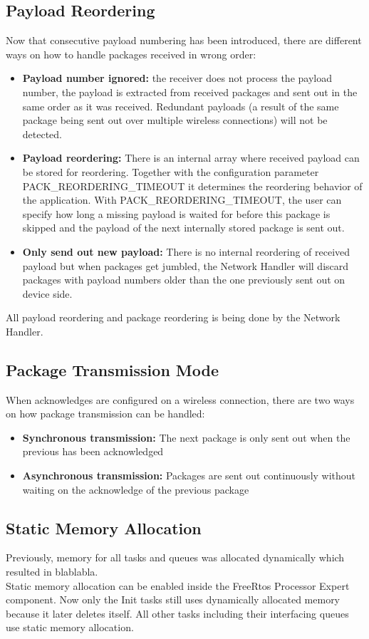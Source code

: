 \subsection{Payload Reordering}
Now that consecutive payload numbering has been introduced, there are different ways on how to handle packages received in wrong order:
\begin{itemize}
    \item \textbf{Payload number ignored:} the receiver does not process the payload number, the payload is extracted from received packages and sent out in the same order as it was received. Redundant payloads (a result of the same package being sent out over multiple wireless connections) will not be detected.
    \item \textbf{Payload reordering:} There is an internal array where received payload can be stored for reordering. Together with the configuration parameter PACK\_REORDERING\_TIMEOUT it determines the reordering behavior of the application. With PACK\_REORDERING\_TIMEOUT, the user can specify how long a missing payload is waited for before this package is skipped and the payload of the next internally stored package is sent out.
    \item \textbf{Only send out new payload:} There is no internal reordering of received payload but when packages get jumbled, the Network Handler will discard packages with payload numbers older than the one previously sent out on device side.
\end{itemize}
All payload reordering and package reordering is being done by the Network Handler. 
%
%
\subsection{Package Transmission Mode} \label{subsec:txtPackageTransmissionMode}
When acknowledges are configured on a wireless connection, there are two ways on how package transmission can be handled:
\begin{itemize}
    \item \textbf{Synchronous transmission:} The next package is only sent out when the previous has been acknowledged
    \item \textbf{Asynchronous transmission:} Packages are sent out continuously without waiting on the acknowledge of the previous package
\end{itemize}
%
%
\subsection{Static Memory Allocation}
Previously, memory for all tasks and queues was allocated dynamically which resulted in blablabla.\\
Static memory allocation can be enabled inside the FreeRtos Processor Expert component. Now only the Init tasks still uses dynamically allocated memory because it later deletes itself. All other tasks including their interfacing queues use static memory allocation.
